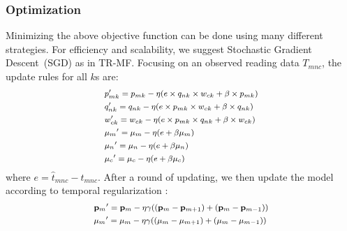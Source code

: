 
\subsubsection{Optimization}
Minimizing the above objective function can be done using many different strategies.
For efficiency and scalability, we suggest Stochastic Gradient Descent~(SGD) as in TR-MF.
Focusing on an observed reading data $T_{mnc} $, the update rules for all $k$s are:
\begin{equation*}
\small
\begin{aligned}
  &p_{mk}^\prime=p_{mk}-\eta(e\times q_{nk}\times w_{ck} + \beta \times p_{mk})
\\&q_{nk}^\prime=q_{nk}-\eta(e\times p_{mk}\times w_{ck} + \beta \times q_{nk})
\\&w_{ck}^\prime=w_{ck}-\eta(e\times p_{mk}\times q_{nk} + \beta \times w_{ck})
\\&{\mu_m}^\prime=\mu_m-\eta(e+\beta\mu_m)
\\&{\mu_n}^\prime=\mu_n-\eta(e+\beta\mu_n)
\\&{\mu_c}^\prime=\mu_c-\eta(e+\beta\mu_c)
\end{aligned}
\end{equation*}
where $e=\hat{t}_{mnc}-t_{mnc}$. After a round of updating, we then update the model according to temporal regularization :
\begin{equation*}
\small
\begin{aligned}
&{\mathbf{p}_m}^\prime={\mathbf{p}_m}-\eta\gamma((\mathbf{p}_m-\mathbf{p}_{m+1})+(\mathbf{p}_m-\mathbf{p}_{m-1}))
\\&{\mu_m}^\prime=\mu_m-\eta\gamma((\mu_m-\mu_{m+1})+(\mu_m-\mu_{m-1}))
\end{aligned}
\end{equation*}

